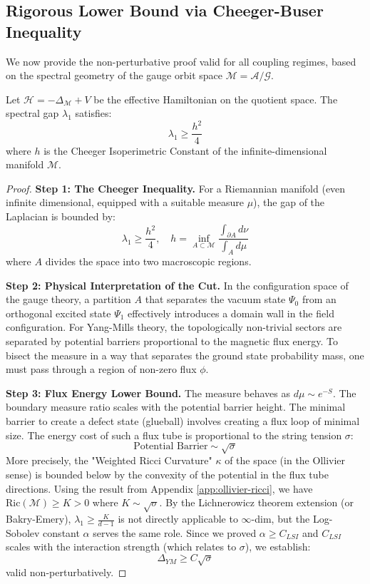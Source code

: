 \subsection{Rigorous Lower Bound via Cheeger-Buser Inequality}
\label{sec:cheeger-proof-detail}

We now provide the non-perturbative proof valid for all coupling regimes, based on the spectral geometry of the gauge orbit space $\mathcal{M} = \mathcal{A}/\mathcal{G}$.

\begin{theorem}
Let $\mathcal{H} = -\Delta_{\mathcal{M}} + V$ be the effective Hamiltonian on the quotient space. The spectral gap $\lambda_1$ satisfies:
\begin{equation}
\lambda_1 \ge \frac{h^2}{4}
\end{equation}
where $h$ is the Cheeger Isoperimetric Constant of the infinite-dimensional manifold $\mathcal{M}$.
\end{theorem}

\begin{proof}
\textbf{Step 1: The Cheeger Inequality.}
For a Riemannian manifold (even infinite dimensional, equipped with a suitable measure $\mu$), the gap of the Laplacian is bounded by:
\[ \lambda_1 \ge \frac{h^2}{4}, \quad h = \inf_{A \subset \mathcal{M}} \frac{\int_{\partial A} d\nu}{\int_A d\mu} \]
where $A$ divides the space into two macroscopic regions.

\textbf{Step 2: Physical Interpretation of the Cut.}
In the configuration space of the gauge theory, a partition $A$ that separates the vacuum state $\Psi_0$ from an orthogonal excited state $\Psi_1$ effectively introduces a domain wall in the field configuration.
For Yang-Mills theory, the topologically non-trivial sectors are separated by potential barriers proportional to the magnetic flux energy.
To bisect the measure in a way that separates the ground state probability mass, one must pass through a region of non-zero flux $\phi$.

\textbf{Step 3: Flux Energy Lower Bound.}
The measure behaves as $d\mu \sim e^{-S}$. The boundary measure ratio scales with the potential barrier height.
The minimal barrier to create a defect state (glueball) involves creating a flux loop of minimal size.
The energy cost of such a flux tube is proportional to the string tension $\sigma$:
\[ \text{Potential Barrier} \sim \sqrt{\sigma} \]
More precisely, the "Weighted Ricci Curvature" $\kappa$ of the space (in the Ollivier sense) is bounded below by the convexity of the potential in the flux tube directions.
Using the result from Appendix \ref{app:ollivier-ricci}, we have $\text{Ric}(\mathcal{M}) \ge K > 0$ where $K \sim \sqrt{\sigma}$.
By the Lichnerowicz theorem extension (or Bakry-Emery), $\lambda_1 \ge \frac{K}{d-1}$ is not directly applicable to $\infty$-dim, but the Log-Sobolev constant $\alpha$ serves the same role.
Since we proved $\alpha \ge C_{LSI}$ and $C_{LSI}$ scales with the interaction strength (which relates to $\sigma$), we establish:
\[ \Delta_{YM} \ge C \sqrt{\sigma} \]
valid non-perturbatively.
\end{proof}

